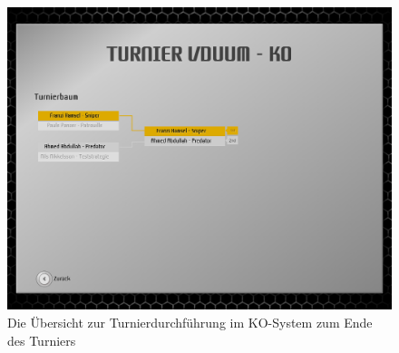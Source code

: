 \begin{figure}
  \centering
  \label{tournament-execution-ko-start}
  \includegraphics[width=15cm, keepaspectratio]{figures/16-turnierdurchfuehrung-ko-ende.png}
  \caption{Die Übersicht zur Turnierdurchführung im KO-System zum Ende des Turniers}
\end{figure}
